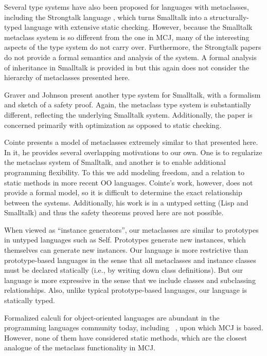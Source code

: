 \documentclass{acmconfbig}
\begin{document}
Several type systems have also been proposed for languages with
metaclasses, including the Strongtalk language \cite{Strongtalk},
which turns Smalltalk into a structurally-typed language with
extensive static checking.  However, because the Smalltalk metaclass
system is so different from the one in MCJ, many of the interesting
aspects of the type system do not carry over.  Furthermore, the
Strongtalk papers do not provide a formal semantics and analysis of
the system.  A formal analysis of inheritance in Smalltalk is provided
in \cite{cook:thesis} but this again does not consider the hierarchy
of metaclasses presented here.

Graver and Johnson \cite{graver:90} present another type system for
Smalltalk, with a formalism and sketch of a safety proof.  Again, the
metaclass type system is substantially different, reflecting the
underlying Smalltalk system.  Additionally, the paper is concerned
primarily with optimization as opposed to static checking.

Cointe \cite{objvlisp} presents a model of metaclasses extremely
similar to that presented here.  In it, he provides several
overlapping motivations to our own.  One is to regularize the
metaclass system of Smalltalk, and another is to enable additional
programming flexibility.  To this we add modeling freedom, and a
relation to static methods in more recent OO languages.  Cointe's
work, however, does not provide a formal model, so it is difficult to
determine the exact relationship between the systems.  Additionally,
his work is in a untyped setting (Lisp and Smalltalk) and thus the
safety theorems proved here are not possible. 

When viewed as ``instance generators'', our metaclasses are similar to
prototypes in untyped languages such as Self.  Prototypes generate new
instances, which themselves can generate new instances.  Our language
is more restrictive than prototype-based languages in the sense that
all metaclasses and instance classes must be declared statically
(i.e., by writing down class definitions).  But our language is more
expressive in the sense that we include classes and subclassing
relationships.  Also, unlike typical prototype-based languages, our
language is statically typed.

Formalized calculi for object-oriented languages are abundant in the
programming languages community today, including \FJ\ \cite{FJ}, upon
which MCJ is based.  However, none of them have considered static
methods, which are the closest analogue of the metaclass functionality
in MCJ.
\end{document}
